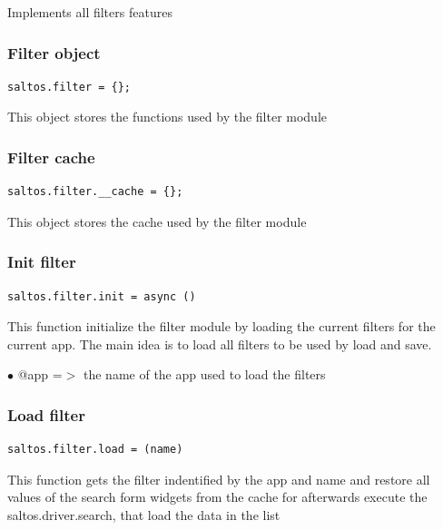\documentclass[a4paper]{article}
\begin{document}
Implements all filters features

\hypertarget{toc208}{}
\subsubsection{Filter object}

\begin{lstlisting}
saltos.filter = {};
\end{lstlisting}

This object stores the functions used by the filter module

\hypertarget{toc209}{}
\subsubsection{Filter cache}

\begin{lstlisting}
saltos.filter.__cache = {};
\end{lstlisting}

This object stores the cache used by the filter module

\hypertarget{toc210}{}
\subsubsection{Init filter}

\begin{lstlisting}
saltos.filter.init = async ()
\end{lstlisting}

This function initialize the filter module by loading the current filters for
the current app. The main idea is to load all filters to be used by load and
save.

\begin{compactitem}
\item[\color{myblue}$\bullet$] @app =$>$ the name of the app used to load the filters
\end{compactitem}

\hypertarget{toc211}{}
\subsubsection{Load filter}

\begin{lstlisting}
saltos.filter.load = (name)
\end{lstlisting}

This function gets the filter indentified by the app and name and restore
all values of the search form widgets from the cache for afterwards execute
the saltos.driver.search, that load the data in the list
\end{document}
